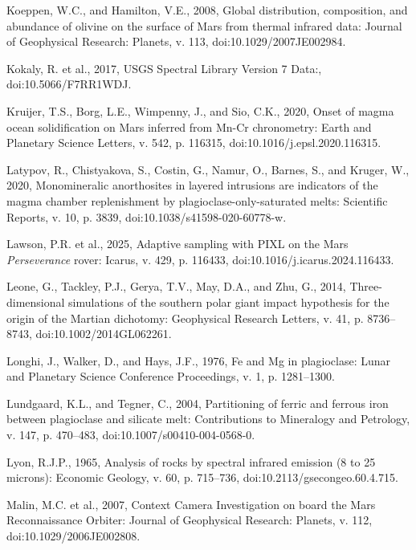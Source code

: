 \documentclass[11pt]{article}
\begin{document}
\begin{thebibliography}{99}
 Koeppen, W.C., and Hamilton, V.E., 2008, Global distribution, composition, and abundance of olivine on the surface of Mars from thermal infrared data: Journal of Geophysical Research: Planets, v. 113, doi:10.1029/2007JE002984.

 Kokaly, R. et al., 2017, USGS Spectral Library Version 7 Data:, doi:10.5066/F7RR1WDJ.

 Kruijer, T.S., Borg, L.E., Wimpenny, J., and Sio, C.K., 2020, Onset of magma ocean solidification on Mars inferred from Mn-Cr chronometry: Earth and Planetary Science Letters, v. 542, p. 116315, doi:10.1016/j.epsl.2020.116315.

 Latypov, R., Chistyakova, S., Costin, G., Namur, O., Barnes, S., and Kruger, W., 2020, Monomineralic anorthosites in layered intrusions are indicators of the magma chamber replenishment by plagioclase-only-saturated melts: Scientific Reports, v. 10, p. 3839, doi:10.1038/s41598-020-60778-w.

 Lawson, P.R. et al., 2025, Adaptive sampling with PIXL on the Mars \textit{Perseverance} rover: Icarus, v. 429, p. 116433, doi:10.1016/j.icarus.2024.116433.

 Leone, G., Tackley, P.J., Gerya, T.V., May, D.A., and Zhu, G., 2014, Three-dimensional simulations of the southern polar giant impact hypothesis for the origin of the Martian dichotomy: Geophysical Research Letters, v. 41, p. 8736--8743, doi:10.1002/2014GL062261.

 Longhi, J., Walker, D., and Hays, J.F., 1976, Fe and Mg in plagioclase: Lunar and Planetary Science Conference Proceedings, v. 1, p. 1281--1300.

 Lundgaard, K.L., and Tegner, C., 2004, Partitioning of ferric and ferrous iron between plagioclase and silicate melt: Contributions to Mineralogy and Petrology, v. 147, p. 470--483, doi:10.1007/s00410-004-0568-0.

 Lyon, R.J.P., 1965, Analysis of rocks by spectral infrared emission (8 to 25 microns): Economic Geology, v. 60, p. 715--736, doi:10.2113/gsecongeo.60.4.715.

 Malin, M.C. et al., 2007, Context Camera Investigation on board the Mars Reconnaissance Orbiter: Journal of Geophysical Research: Planets, v. 112, doi:10.1029/2006JE002808.


\end{thebibliography}
\end{document}
